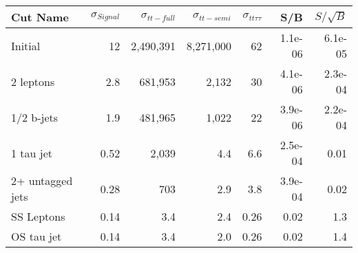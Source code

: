 \begin{tabular}{lrrrrrr}
\toprule
         Cut Name &  $\sigma_{Signal}$ &  $\sigma_{tt-full}$ &  $\sigma_{tt-semi}$ &  $\sigma_{tt\tau\tau}$ &     S/B &  $S/\sqrt{B}$ \\
\midrule
          Initial &                 12 &           2,490,391 &           8,271,000 &                     62 & 1.1e-06 &       6.1e-05 \\
        2 leptons &                2.8 &             681,953 &               2,132 &                     30 & 4.1e-06 &       2.3e-04 \\
       1/2 b-jets &                1.9 &             481,965 &               1,022 &                     22 & 3.9e-06 &       2.2e-04 \\
        1 tau jet &               0.52 &               2,039 &                 4.4 &                    6.6 & 2.5e-04 &          0.01 \\
 2+ untagged jets &               0.28 &                 703 &                 2.9 &                    3.8 & 3.9e-04 &          0.02 \\
       SS Leptons &               0.14 &                 3.4 &                 2.4 &                   0.26 &    0.02 &           1.3 \\
       OS tau jet &               0.14 &                 3.4 &                 2.0 &                   0.26 &    0.02 &           1.4 \\
\bottomrule
\end{tabular}
